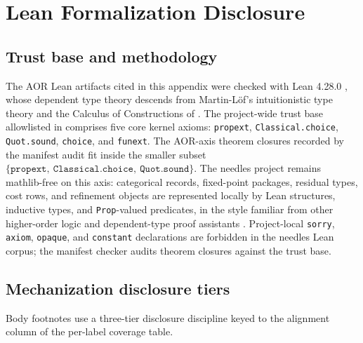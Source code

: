 \documentclass[11pt]{article}
\theoremstyle{definition}
\begin{document}
 \section{Lean Formalization Disclosure}
\label{app:aor-formalization}

\subsection{Trust base and methodology}
\label{subsec:paper4-trust-methodology}

The AOR Lean artifacts cited in this appendix were checked with Lean
4.28.0 \citep{deMouraUllrich2021Lean4}, whose dependent type theory
descends from Martin-L{\"o}f's intuitionistic type theory
\citep{MartinLof1984IntuitionisticTypeTheory} and the Calculus of
Constructions of \citet{CoquandHuet1988CalculusConstructions}.  The
project-wide trust base allowlisted in
 comprises five core kernel
axioms: \texttt{propext}, \texttt{Classical.choice}, \texttt{Quot.sound},
\texttt{choice}, and \texttt{funext}.  The AOR-axis theorem closures
recorded by the manifest audit fit inside the smaller subset
$\{\texttt{propext},\ \texttt{Classical.choice},\ \texttt{Quot.sound}\}$.
The needles project remains mathlib-free \citep{MathlibCommunity2020Lean}
on this axis: categorical records, fixed-point packages, residual
types, cost rows, and refinement objects are represented locally by
Lean structures, inductive types, and \texttt{Prop}-valued predicates,
in the style familiar from other higher-order logic and dependent-type
proof assistants \citep{NipkowPaulsonWenzel2002IsabelleHOL}.
Project-local \texttt{sorry}, \texttt{axiom}, \texttt{opaque}, and
\texttt{constant} declarations are forbidden in the needles Lean
corpus; the manifest checker audits theorem closures against the
trust base.

\subsection{Mechanization disclosure tiers}
\label{subsec:paper4-mechanization-disclosure-tiers}

Body footnotes use a three-tier disclosure discipline keyed to the
alignment column of the per-label coverage table.
\end{document}

